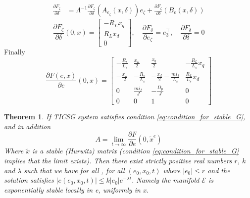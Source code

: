 \documentclass[letterpaper, 10 pt, conference]{ieeeconf}
\newtheorem{theorem}{Theorem}[section]
\begin{document}
$$
\begin{aligned}
 \frac{\partial F_\zeta}{\partial \delta} & =  \varLambda^{-1} \frac{\partial F_\zeta}{\partial \delta}\left( A_{e_\zeta}(x,\delta) \right)e_\zeta+ \frac{\partial F_\zeta}{\partial \delta}\left(B_e(x,\delta)\right)
 \end{aligned}
$$
$$
 \frac{\partial F_\zeta}{\partial \delta}(0,x)  =  \left[\begin{array}{ccc}
 -R_L x_q\\
R_Lx_d\\
0
\end{array}\right],\quad \frac{\partial F_\delta}{\partial e_\zeta}=e_3^\top,\quad \frac{\partial F_\delta}{\partial \delta}
=0$$
Finally
\begin{equation}
\frac{\partial F(e,x)}{\partial e}(0,x)=\left[\begin{array}{cccc}
-\frac{R_{s}}{L_{s}} & \frac{x_{\omega}}{2} & \frac{x_{q}}{2} & -\frac{R_{L}}{L_{s}}x_{q}\\
-\frac{x_{\omega}}{2} & -\frac{R_{s}}{L_{s}} & -\frac{x_{d}}{2}-\frac{mi_f}{L_{s}} & \frac{R_{L}}{L_{s}}x_{d}\\
0 & \frac{mi_{f}}{J} & -\frac{D_{p}}{J} & 0\\
0 & 0 & 1 & 0
\end{array}\right]
\label{eq:AOft}
\end{equation}

\begin{theorem}\label{theorem:TICSGSync}
If TICSG system satisfies  condition \eqref{eq:condition_for_stable_G}, and in addition 
\begin{equation}
A=\lim_{t \to \infty}\frac{\partial F}{\partial e}(0,\tilde{x}^e)
\label{eq:eLinearizationLimit}
\end{equation}
Where $\tilde{x}$ is a stable (Hurwitz) matrix (condition \eqref{eq:condition_for_stable_G} implies that the limit exists). Then there exist strictly positive real numbers $r$, $k$ and $\lambda$ such that we have for all , for all $\left(e_0, x_0, t\right)$  where $\left| e_0\right| \le r$ and the solution satisfies $\left|e\left(e_0, x_0, t\right)\right| \le k\left|e_0\right| e^{-\lambda t}$. Namely the manifold $\mathscr{E}$ is exponentially stable locally in e, uniformly in x.
\end{theorem}
 
\end{document}
